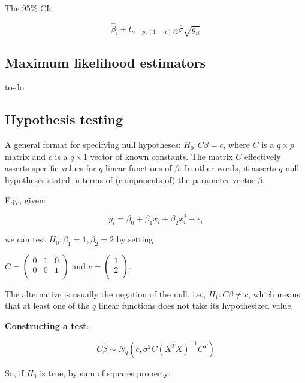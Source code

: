 The 95\% CI:


\begin{equation}
\hat{\beta}_i \pm t_{n-p,(1-\alpha)/2} \hat{\sigma} \sqrt{g_{ii}} 
\end{equation}

\subsection{Maximum likelihood estimators}

to-do

\subsection{Hypothesis testing}

A general format for specifying null hypotheses: $H_0: C\beta = c$, where $C$ is a $q\times p$ matrix and $c$ is a $q\times 1$ vector of known constants. The matrix $C$ effectively asserts specific values for $q$ linear functions of $\beta$. In other words, it asserts $q$ null hypotheses stated in terms of (components of) the parameter vector $\beta$.

 E.g., given:

\begin{equation}
y_i = \beta_0 + \beta_1 x_i + \beta_2 x_i^2+\epsilon_i
\end{equation}

\noindent
we can test $H_0: \beta_1=1, \beta_2=2$ by setting 

$C=\begin{pmatrix} 
0 & 1 & 0\\
0 & 0 & 1\\
\end{pmatrix}$
and $c=\begin{pmatrix} 
1\\
2\\
\end{pmatrix}$.

The alternative is usually the negation of the null, i.e., $H_1: C\beta\neq c$, which means that at least one of the $q$ linear functions does not take its hypothesized value. 

\textbf{Constructing a test}:

\begin{equation}
C\hat{\beta} \sim N_q (c,\sigma^2 C (X^T X)^{-1} C^T)
\end{equation}

So, if $H_0$ is true, by sum of squares property:

